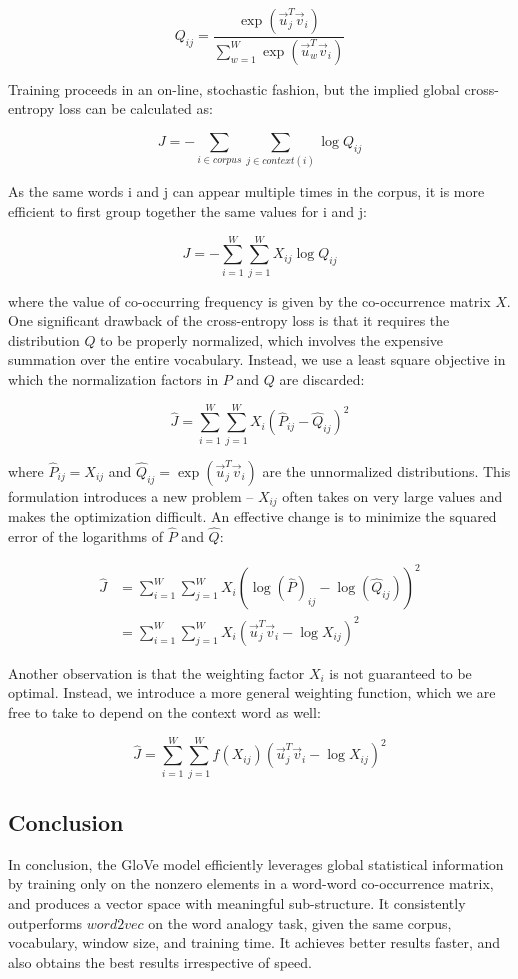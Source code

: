 \documentclass{tufte-handout}
\begin{document}
\[
	Q_{ij} = \frac{\exp(\vec{u}_j^T \vec{v}_i)}{\sum_{w=1}^W \exp(\vec{u}_w^T \vec{v}_i)}
\]

Training proceeds in an on-line, stochastic fashion, but the implied global cross-entropy loss can be calculated as:

\[
	J = -\sum_{i \in corpus} \sum_{j \in context(i)} \log Q_{ij}
\]

As the same words i and j can appear multiple times in the corpus, it is more efficient to first group together the same values for i and j:

\[
	J = -\sum_{i=1}^W \sum_{j=1}^W X_{ij} \log Q_{ij}
\]

where the value of co-occurring frequency is given by the co-occurrence matrix $X$. One significant drawback of the cross-entropy loss is that it requires the distribution $Q$ to be properly normalized, which involves the expensive summation over the entire vocabulary. Instead, we use a least square objective in which the normalization factors in $P$ and $Q$ are discarded:

\[
	\hat{J} = \sum_{i=1}^W \sum_{j=1}^W X_i (\hat{P}_{ij} - \hat{Q}_{ij})^2
\]

where $\hat{P}_{ij} = X_{ij}$ and $\hat{Q}_{ij} = \exp(\vec{u}_j^T \vec{v}_i)$ are the unnormalized distributions. This formulation introduces a new problem -- $X_{ij}$ often takes on very large values and makes the optimization difficult. An effective change is to minimize the squared error of the logarithms of  $\hat{P}$ and $\hat{Q}$:

\begin{align*}
	\hat{J} & = \sum_{i=1}^W \sum_{j=1}^W X_i (\log(\hat{P})_{ij} - \log(\hat{Q}_{ij}))^2 \\
    & = \sum_{i=1}^W \sum_{j=1}^W X_i (\vec{u}_j^T \vec{v}_i - \log X_{ij})^2
\end{align*}

Another observation is that the weighting factor $X_i$ is not guaranteed to be optimal. Instead, we introduce a more general weighting function, which we are free to take to depend on the context word as well:

\[
	\hat{J} = \sum_{i=1}^W \sum_{j=1}^W f(X_{ij}) (\vec{u}_j^T \vec{v}_i - \log X_{ij})^2
\]

\subsection{Conclusion}
In conclusion, the GloVe model efficiently leverages global statistical information by training only on the nonzero elements in a word-word co-occurrence matrix, and produces a vector space with meaningful sub-structure. It consistently outperforms $word2vec$ on the word analogy task, given the same corpus, vocabulary, window size, and training time. It achieves better results faster, and also obtains the best results irrespective of speed. 
\end{document}
